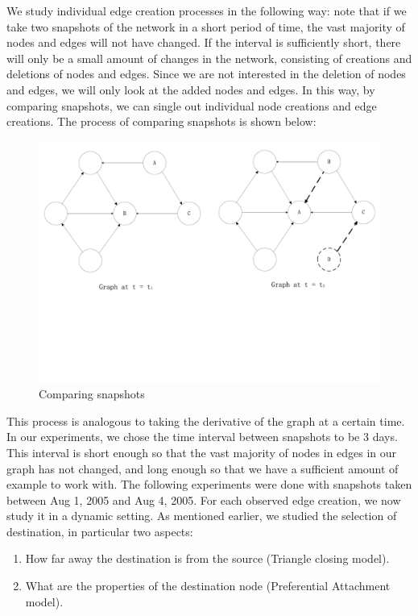 \documentclass[10pt,twocolumn]{article}
\begin{document}
We study individual edge creation processes in the following way: note that if we take two snapshots of the network in a short period of time, the vast majority of nodes and edges will not have changed. If the interval is sufficiently short, there will only be a small amount of changes in the network, consisting of creations and deletions of nodes and edges. Since we are not interested in the deletion of nodes and edges, we will only look at the added nodes and edges. In this way, by comparing snapshots, we can single out individual node creations and edge creations. The process of comparing snapshots is shown below:
\begin{figure}[ht]
    \centering
        \includegraphics[scale = 0.25, trim = 0cm 8cm 0cm 0cm,clip=true]{./graphs/dynamic.pdf}
    \caption{Comparing snapshots} \label{fig:compare}
\end{figure}

This process is analogous to taking the derivative of the graph at a certain time. In our experiments, we chose the time interval between snapshots to be 3 days. This interval is short enough so that the vast majority of nodes in edges in our graph has not changed, and long enough so that we have a sufficient amount of example to work with. The following experiments were done with snapshots taken between Aug 1, 2005 and Aug 4, 2005.
For each observed edge creation, we now study it in a dynamic setting. As mentioned earlier, we studied the selection of destination, in particular two aspects:
\begin{enumerate}
\item How far away the destination is from the source (Triangle closing model).
\item What are the properties of the destination node (Preferential Attachment model).
\end{enumerate}
\end{document}
